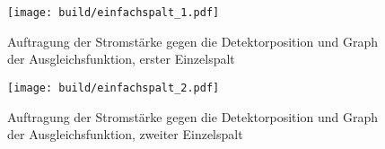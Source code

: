 \begin{figure}
  \centering
  \texttt{[image: build/einfachspalt\_1.pdf]}
  \caption{Auftragung der Stromstärke gegen die Detektorposition und Graph der Ausgleichsfunktion, erster Einzelspalt}
  \label{fig:spalt1}
\end{figure}

\begin{figure}
  \centering
  \texttt{[image: build/einfachspalt\_2.pdf]}
  \caption{Auftragung der Stromstärke gegen die Detektorposition und Graph der Ausgleichsfunktion, zweiter Einzelspalt}
  \label{fig:spalt2}
\end{figure}
